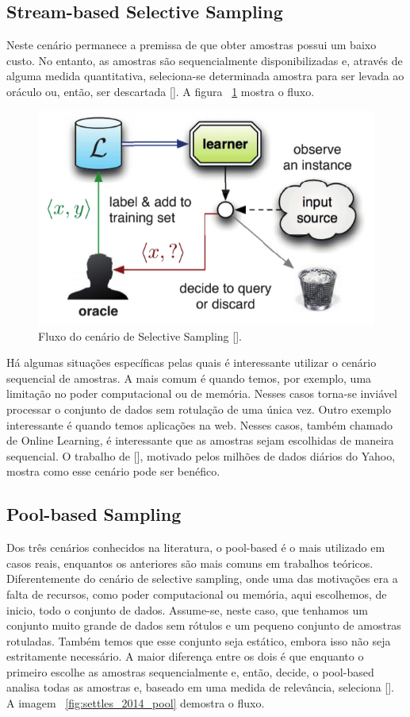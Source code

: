 \subsection{Stream-based Selective Sampling}
\label{sec:cenarios_selective_sampling}

Neste cenário permanece a premissa de que obter amostras possui um baixo custo. No entanto, as amostras são sequencialmente disponibilizadas e, através de alguma medida quantitativa, seleciona-se determinada amostra para ser levada ao oráculo ou, então, ser descartada [\cite{settles2014active}]. A figura ~\ref{fig:settles_2014_selective_sampling} mostra o fluxo. 

\begin{figure}
  \centering
  \includegraphics[width=.5\textwidth]{figures/settles_2014_selective_sampling.png}
  \caption{Fluxo do cenário de Selective Sampling [\cite{settles2014active}].}
  \label{fig:settles_2014_selective_sampling}
\end{figure}


Há algumas situações específicas pelas quais é interessante utilizar o cenário sequencial de amostras. A mais comum é quando temos, por exemplo, uma limitação no poder computacional ou de memória. Nesses casos torna-se inviável processar o conjunto de dados sem rotulação de uma única vez. Outro exemplo interessante é quando temos aplicações na web. Nesses casos, também chamado de Online Learning, é interessante que as amostras sejam escolhidas de maneira sequencial. O trabalho de [\cite{chu2011unbiased}], motivado pelos milhões de dados diários do Yahoo, mostra como esse cenário pode ser benéfico. 




\subsection{Pool-based Sampling}
\label{sec:cenarios_pool}

Dos três cenários conhecidos na literatura, o pool-based é o mais utilizado em casos reais, enquantos os anteriores são mais comuns em trabalhos teóricos. Diferentemente do cenário de selective sampling, onde uma das motivações era a falta de recursos, como poder computacional ou memória, aqui escolhemos, de inicio, todo o conjunto de dados. Assume-se, neste caso, que tenhamos um conjunto muito grande de dados sem rótulos e um pequeno conjunto de amostras rotuladas. Também temos que esse conjunto seja estático, embora isso não seja estritamente necessário. A maior diferença entre os dois é que enquanto o primeiro escolhe as amostras sequencialmente e, então, decide, o pool-based analisa todas as amostras e, baseado em uma medida de relevância, seleciona [\cite{settles2014active}]. A imagem ~\ref{fig:settles_2014_pool}  demostra o fluxo.

